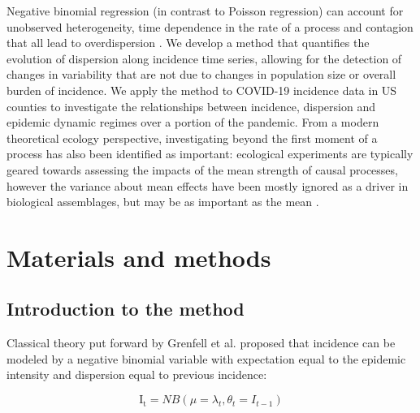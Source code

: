 \documentclass[10pt,letterpaper]{article}
\begin{document}
Negative binomial regression (in contrast to Poisson regression) can account for unobserved heterogeneity, time dependence in the rate of a process and contagion that all lead to overdispersion \cite{barron_analysis_1992}.
We develop a method that quantifies the evolution of dispersion along incidence time series, allowing for the detection of changes in variability that are not due to changes in population size or overall burden of incidence.
We apply the method to COVID-19 incidence data in US counties to investigate the relationships between incidence, dispersion and epidemic dynamic regimes over a portion of the pandemic. 
From a modern theoretical ecology perspective, investigating beyond the first moment of a process has also been identified as important: ecological experiments are typically geared towards assessing the impacts of the mean strength of causal processes, however the variance about mean effects have been mostly ignored as a driver in biological assemblages, but may be as important as the mean \cite{benedetti-cecchi_importance_2003}.

\section*{Materials and methods}
\subsection*{Introduction to the method}

Classical theory put forward by Grenfell et al. \cite{grenfell_dynamics_2002} proposed that incidence can be modeled by a negative binomial variable with expectation equal to the epidemic intensity and dispersion equal to previous incidence:

\begin{equation}
    \mathrm{I_t} = NB(\mu = \lambda_t, \theta_t = I_{t-1})
\end{equation}
\end{document}
